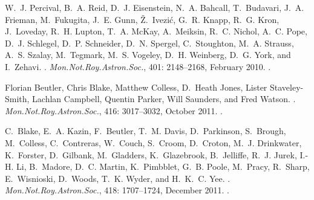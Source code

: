 \documentclass[a4paper,11pt]{article}
\begin{document}
\begin{thebibliography}{23}
W.~J. {Percival}, B.~A. {Reid}, D.~J. {Eisenstein}, N.~A. {Bahcall},
  T.~{Budavari}, J.~A. {Frieman}, M.~{Fukugita}, J.~E. {Gunn}, {\v
  Z}.~{Ivezi{\'c}}, G.~R. {Knapp}, R.~G. {Kron}, J.~{Loveday}, R.~H. {Lupton},
  T.~A. {McKay}, A.~{Meiksin}, R.~C. {Nichol}, A.~C. {Pope}, D.~J. {Schlegel},
  D.~P. {Schneider}, D.~N. {Spergel}, C.~{Stoughton}, M.~A. {Strauss}, A.~S.
  {Szalay}, M.~{Tegmark}, M.~S. {Vogeley}, D.~H. {Weinberg}, D.~G. {York}, and
  I.~{Zehavi}.
.
\newblock \emph{Mon.Not.Roy.Astron.Soc.}, 401: 2148--2168, February
  2010.
\newblock {}.

Florian Beutler, Chris Blake, Matthew Colless, D.~Heath Jones, Lister
  Staveley-Smith, Lachlan Campbell, Quentin Parker, Will Saunders, and Fred
  Watson.
.
\newblock \emph{Mon.Not.Roy.Astron.Soc.}, 416: 3017--3032, October
  2011.
\newblock {}.

C.~{Blake}, E.~A. {Kazin}, F.~{Beutler}, T.~M. {Davis}, D.~{Parkinson},
  S.~{Brough}, M.~{Colless}, C.~{Contreras}, W.~{Couch}, S.~{Croom},
  D.~{Croton}, M.~J. {Drinkwater}, K.~{Forster}, D.~{Gilbank}, M.~{Gladders},
  K.~{Glazebrook}, B.~{Jelliffe}, R.~J. {Jurek}, I.-H. {Li}, B.~{Madore}, D.~C.
  {Martin}, K.~{Pimbblet}, G.~B. {Poole}, M.~{Pracy}, R.~{Sharp},
  E.~{Wisnioski}, D.~{Woods}, T.~K. {Wyder}, and H.~K.~C. {Yee}.
.
\newblock \emph{Mon.Not.Roy.Astron.Soc.}, 418: 1707--1724, December
  2011.
\newblock {}.


\end{thebibliography}
\end{document}

